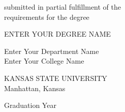 \begin{center}
   \vspace{0.3cm}
   \begin{singlespace}
   submitted in partial fulfillment of the\\
   requirements for the degree\\
   \end{singlespace}

   \vspace{0.3cm}


   {\large ENTER YOUR DEGREE NAME}\\
   \vspace{0.3cm}


   \begin{singlespace}
   Enter Your Department Name\\
   Enter Your College Name\\
   \end{singlespace}

   \vspace{0.3cm}

   \begin{singlespace}
   {\large KANSAS STATE UNIVERSITY}\\
   Manhattan, Kansas\\
   \end{singlespace}


   Graduation Year\\
   \vspace{0.3cm}

    \end{center}

